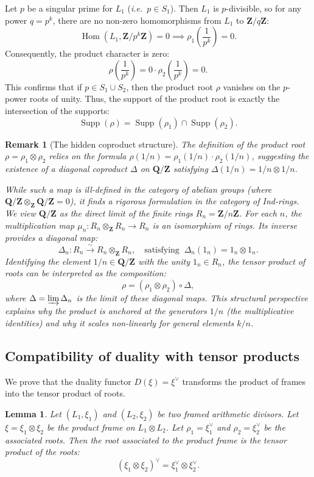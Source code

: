 \documentclass[11pt,a4paper]{article}
\newcommand{\Q}{\mathbf{Q}}
\newcommand{\Z}{\mathbf{Z}}
\def\ie{{\it i.e.\/}\ }
\theoremstyle{plain}
\newtheorem{lem}[thm]{Lemma}
\newtheorem{rem}[thm]{Remark}
\theoremstyle{definition} %
\begin{document}
Let $p$ be a singular prime for $L_1$ (\ie $p \in S_1$).
Then $L_1$ is $p$-divisible, so for any power $q=p^k$, there are no non-zero homomorphisms from $L_1$ to $\Z/q\Z$:
\[
\operatorname{Hom}(L_1, \Z/p^k\Z) = 0 \implies \rho_1\left(\frac{1}{p^k}\right) = 0.
\]
Consequently, the product character is zero:
\[
\rho\left(\frac{1}{p^k}\right) = 0 \cdot \rho_2\left(\frac{1}{p^k}\right) = 0.
\]
This confirms that if $p \in S_1 \cup S_2$, then the product root $\rho$ vanishes on the $p$-power roots of unity.
Thus, the support of the product root is exactly the intersection of the supports:
\[
\operatorname{Supp}(\rho) = \operatorname{Supp}(\rho_1) \cap \operatorname{Supp}(\rho_2).
\]
\begin{rem}[The hidden coproduct structure]
The definition of the product root $\rho = \rho_1 \otimes \rho_2$ relies on the formula $\rho(1/n) = \rho_1(1/n) \cdot \rho_2(1/n)$, suggesting the existence of a diagonal coproduct $\Delta$ on $\Q/\Z$ satisfying $\Delta(1/n) = 1/n \otimes 1/n$.

While such a map is ill-defined in the category of abelian groups (where $\Q/\Z \otimes_\Z \Q/\Z = 0$), it finds a rigorous formulation in the category of Ind-rings.
We view $\Q/\Z$ as the direct limit of the finite rings $R_n = \Z/n\Z$. For each $n$, the multiplication map $\mu_n: R_n \otimes_\Z R_n \to R_n$ is an isomorphism of rings. Its inverse provides a diagonal map:
\[
\Delta_n: R_n \xrightarrow{\sim} R_n \otimes_\Z R_n, \quad \text{satisfying }~ \Delta_n(1_n) = 1_n \otimes 1_n.
\]
Identifying the element $1/n \in \Q/\Z$ with the unity $1_n \in R_n$, the tensor product of roots can be interpreted as the composition:
\[
\rho = (\rho_1 \otimes \rho_2) \circ \Delta,
\]
where $\Delta = \varinjlim \Delta_n$ is the limit of these diagonal maps. This structural perspective explains why the product is anchored at the generators $1/n$ (the multiplicative identities) and why it scales non-linearly for general elements $k/n$.
\end{rem}

\subsection{Compatibility of duality with tensor products}

We prove that the duality functor  $D(\xi) = \xi^\vee$ transforms the product of frames into the tensor product of roots.

\begin{lem}\label{dualtensor}
Let $(L_1, \xi_1)$ and $(L_2, \xi_2)$ be two framed arithmetic divisors.
Let $\xi = \xi_1 \otimes \xi_2$ be the product frame on $L_1 \otimes L_2$.
Let $\rho_1 = \xi_1^\vee$ and $\rho_2 = \xi_2^\vee$ be the associated roots.
Then the root associated to the product frame is the tensor product of the roots:
\[
(\xi_1 \otimes \xi_2)^\vee = \xi_1^\vee \otimes \xi_2^\vee.
\]
\end{lem}
\end{document}
